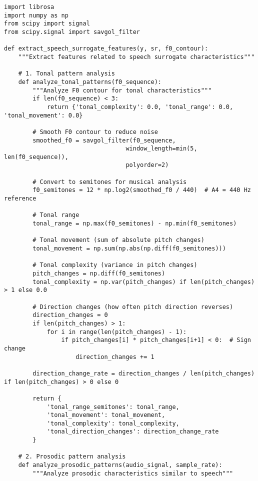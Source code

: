 \documentclass[12pt]{article}
\begin{document}
\begin{verbatim}
import librosa
import numpy as np
from scipy import signal
from scipy.signal import savgol_filter

def extract_speech_surrogate_features(y, sr, f0_contour):
    """Extract features related to speech surrogate characteristics"""
    
    # 1. Tonal pattern analysis
    def analyze_tonal_patterns(f0_sequence):
        """Analyze F0 contour for tonal characteristics"""
        if len(f0_sequence) < 3:
            return {'tonal_complexity': 0.0, 'tonal_range': 0.0, 'tonal_movement': 0.0}
        
        # Smooth F0 contour to reduce noise
        smoothed_f0 = savgol_filter(f0_sequence, 
                                  window_length=min(5, len(f0_sequence)), 
                                  polyorder=2)
        
        # Convert to semitones for musical analysis
        f0_semitones = 12 * np.log2(smoothed_f0 / 440)  # A4 = 440 Hz reference
        
        # Tonal range
        tonal_range = np.max(f0_semitones) - np.min(f0_semitones)
        
        # Tonal movement (sum of absolute pitch changes)
        tonal_movement = np.sum(np.abs(np.diff(f0_semitones)))
        
        # Tonal complexity (variance in pitch changes)
        pitch_changes = np.diff(f0_semitones)
        tonal_complexity = np.var(pitch_changes) if len(pitch_changes) > 1 else 0.0
        
        # Direction changes (how often pitch direction reverses)
        direction_changes = 0
        if len(pitch_changes) > 1:
            for i in range(len(pitch_changes) - 1):
                if pitch_changes[i] * pitch_changes[i+1] < 0:  # Sign change
                    direction_changes += 1
        
        direction_change_rate = direction_changes / len(pitch_changes) if len(pitch_changes) > 0 else 0
        
        return {
            'tonal_range_semitones': tonal_range,
            'tonal_movement': tonal_movement,
            'tonal_complexity': tonal_complexity,
            'tonal_direction_changes': direction_change_rate
        }
    
    # 2. Prosodic pattern analysis
    def analyze_prosodic_patterns(audio_signal, sample_rate):
        """Analyze prosodic characteristics similar to speech"""
        

\end{verbatim}
\end{document}

